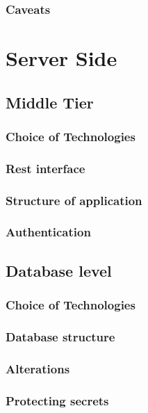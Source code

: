 \subsubsection*{Caveats}




\section{Server Side}

\subsection{Middle Tier}

\subsubsection*{Choice of Technologies}

\subsubsection*{Rest interface}

\subsubsection*{Structure of application}

\subsubsection*{Authentication}



\subsection{Database level}

\subsubsection*{Choice of Technologies}

\subsubsection*{Database structure}

\subsubsection*{Alterations}

\subsubsection*{Protecting secrets}